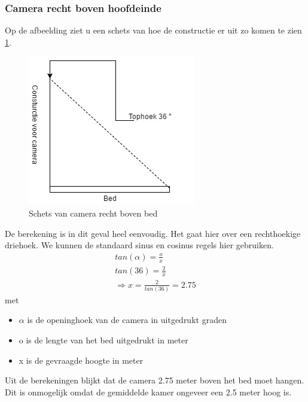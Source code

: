 \subsubsection{Camera recht boven hoofdeinde}
Op de afbeelding ziet u een schets van hoe de constructie er uit zo komen te zien \ref{imgCBB}.
\begin{figure}[h]
	\includegraphics[scale=0.75]{CamBovenBed}
	\caption{Schets van camera recht boven bed}
	\label{imgCBB}
\end{figure}
De berekening is in dit geval heel eenvoudig. Het gaat hier over een rechthoekige driehoek. We kunnen de standaard sinus en cosinus regels hier gebruiken.
\begin{gather}
tan(\alpha) =\frac{o}{x}\\
tan(36) = \frac{2}{x} \\
\Rightarrow x = \frac{2}{tan(36)} = 2.75
\end{gather}
met
\begin{itemize}
	\item $\alpha$ is de openinghoek van de camera in uitgedrukt graden
	\item o is de lengte van het bed uitgedrukt in meter
	\item x is de gevraagde hoogte in meter
\end{itemize}

Uit de berekeningen blijkt dat de camera 2.75 meter boven het bed moet hangen. Dit is onmogelijk omdat de gemiddelde kamer ongeveer een 2.5 meter hoog is.

